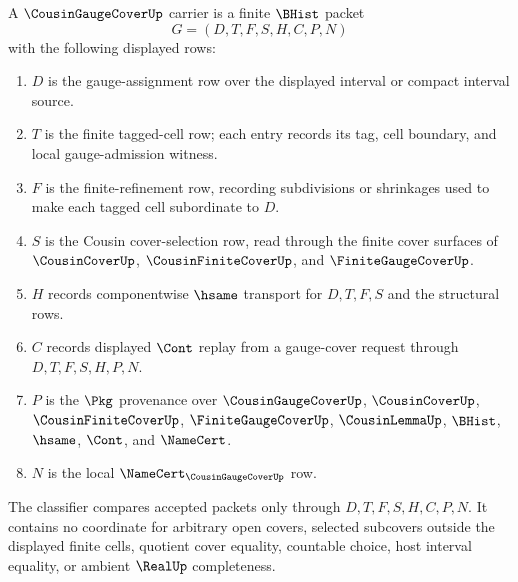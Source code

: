 \begin{definition}
\label{def:cousin-gauge-cover-carrier}
A $\CousinGaugeCoverUp$ carrier is a finite $\BHist$ packet
$$
G=(D,T,F,S,H,C,P,N)
$$
with the following displayed rows:
\begin{enumerate}
\item $D$ is the gauge-assignment row over the displayed interval or compact interval source.
\item $T$ is the finite tagged-cell row; each entry records its tag, cell boundary, and local gauge-admission witness.
\item $F$ is the finite-refinement row, recording subdivisions or shrinkages used to make each tagged cell subordinate to $D$.
\item $S$ is the Cousin cover-selection row, read through the finite cover surfaces of $\CousinCoverUp$, $\CousinFiniteCoverUp$, and $\FiniteGaugeCoverUp$.
\item $H$ records componentwise $\hsame$ transport for $D,T,F,S$ and the structural rows.
\item $C$ records displayed $\Cont$ replay from a gauge-cover request through $D,T,F,S,H,P,N$.
\item $P$ is the $\Pkg$ provenance over $\CousinGaugeCoverUp$, $\CousinCoverUp$, $\CousinFiniteCoverUp$, $\FiniteGaugeCoverUp$, $\CousinLemmaUp$, $\BHist$, $\hsame$, $\Cont$, and $\NameCert$.
\item $N$ is the local $\NameCert_{\CousinGaugeCoverUp}$ row.
\end{enumerate}
The classifier compares accepted packets only through $D,T,F,S,H,C,P,N$. It contains no coordinate for arbitrary open covers, selected subcovers outside the displayed finite cells, quotient cover equality, countable choice, host interval equality, or ambient $\RealUp$ completeness.
\end{definition}

